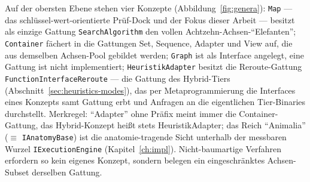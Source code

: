 \begin{nurkurz}
Auf der obersten Ebene stehen vier Konzepte (Abbildung~\ref{fig:genera}): \texttt{Map} --- das
schlüssel-wert-orientierte Prüf-Dock und der Fokus dieser Arbeit --- besitzt als einzige Gattung
\texttt{SearchAlgorithm} den vollen Achtzehn-Achsen-\enquote{Elefanten}; \texttt{Container} fächert in die Gattungen
Set, Sequence, Adapter und View auf, die aus demselben Achsen-Pool gebildet werden; \texttt{Graph} ist als
Interface angelegt, eine Gattung ist nicht implementiert; \texttt{HeuristikAdapter} besitzt die Reroute-Gattung
\texttt{FunctionInterfaceReroute} --- die Gattung des Hybrid-Tiers (Abschnitt~\ref{sec:heuristics-modes}), das
per Metaprogrammierung die Interfaces eines Konzepts samt Gattung erbt und Anfragen an die eigentlichen
Tier-Binaries durchstellt. Merkregel: \enquote{Adapter} ohne Präfix meint immer die Container-Gattung, das
Hybrid-Konzept heißt stets HeuristikAdapter; das Reich \enquote{Animalia} ($\equiv$ \texttt{IAnatomyBase}) ist
die anatomie-tragende Sicht unterhalb der messbaren Wurzel \texttt{IExecutionEngine} (Kapitel~\ref{ch:impl}).
Nicht-baumartige Verfahren erfordern so kein eigenes Konzept, sondern belegen ein eingeschränktes
Achsen-Subset derselben Gattung.
\begin{figure}[htbp]\centering
\end{figure}
\end{nurkurz}
